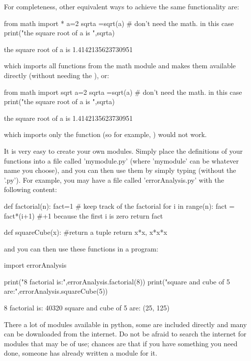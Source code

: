 For completeness, other equivalent ways to achieve the same functionality are:
\begin{python}[caption = \mbox{}]
from math import *
a=2
sqrta =sqrt(a) # don't need the math. in this case
print("the square root of a is ",sqrta)
\end{python}
\begin{poutput}
the square root of a is  1.4142135623730951
\end{poutput}
which imports all functions from the math module and makes them available directly (without needing the ), or:
\begin{python}[caption = \mbox{}]
from math import sqrt
a=2
sqrta =sqrt(a) # don't need the math. in this case
print("the square root of a is ",sqrta)
\end{python}
\begin{poutput}
the square root of a is  1.4142135623730951
\end{poutput}
which imports only the  function (so for example, ) would not work.

It is very easy to create your own modules. Simply place the definitions of your functions into a file called 'mymodule.py' (where 'mymodule' can be whatever name you choose), and you can then use them by simply typing  (without the '.py'). For example, you may have a file called 'errorAnalysis.py' with the following content:
\begin{python}[caption = \mbox{}]
def factorial(n):
    fact=1 # keep track of the factorial
    for i in range(n):
        fact = fact*(i+1) #+1 because the first i is zero
    return fact
    
def squareCube(x):
  #return a tuple
  return x*x, x*x*x    
\end{python}
and you can then use these functions in a program:
\begin{python}[caption = \mbox{}]
import errorAnalysis

print("8 factorial is:",errorAnalysis.factorial(8))
print("square and cube of 5 are:",errorAnalysis.squareCube(5))
\end{python}
\begin{poutput}
8 factorial is: 40320
square and cube of 5 are: (25, 125)
\end{poutput}
There a lot of modules available in python, some are included directly and many can be downloaded from the internet. Do not be afraid to search the internet for modules that may be of use; chances are that if you have something you need done, someone has already written a module for it.
